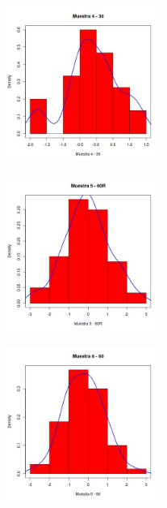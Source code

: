 \documentclass[a4paper,10pt,twocolumn]{report}
\begin{document}
	\begin{figure}[H]
		\centering
		\includegraphics[width=0.45\textwidth]{img/ex2/Histograms/Histogram4.jpeg}
		\label{hist:2.4}
	\end{figure}

	\begin{figure}[H]
		\centering
		\includegraphics[width=0.45\textwidth]{img/ex2/Histograms/Histogram5.jpeg}
		\label{hist:2.5}
	\end{figure}

	\begin{figure}[H]
		\centering
		\includegraphics[width=0.45\textwidth]{img/ex2/Histograms/Histogram6.jpeg}
		\label{hist:2.6}	
	\end{figure}
\end{document}
